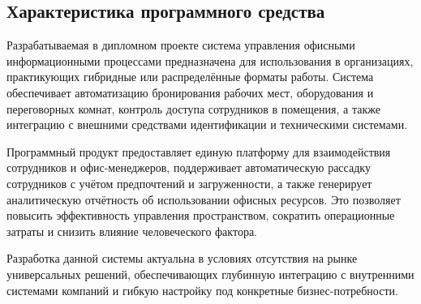 \subsection{Характеристика программного средства}
\label{sec:economics:characteristic}


Разрабатываемая в дипломном проекте система управления офисными информационными процессами предназначена для использования в организациях, практикующих гибридные или распределённые форматы работы. Система обеспечивает автоматизацию бронирования рабочих мест, оборудования и переговорных комнат, контроль доступа сотрудников в помещения, а также интеграцию с внешними средствами идентификации и техническими системами.

Программный продукт предоставляет единую платформу для взаимодействия сотрудников и офис-менеджеров, поддерживает автоматическую рассадку сотрудников с учётом предпочтений и загруженности, а также генерирует аналитическую отчётность об использовании офисных ресурсов. Это позволяет повысить эффективность управления пространством, сократить операционные затраты и снизить влияние человеческого фактора.

Разработка данной системы актуальна в условиях отсутствия на рынке универсальных решений, обеспечивающих глубинную интеграцию с внутренними системами компаний и гибкую настройку под конкретные бизнес-потребности.
